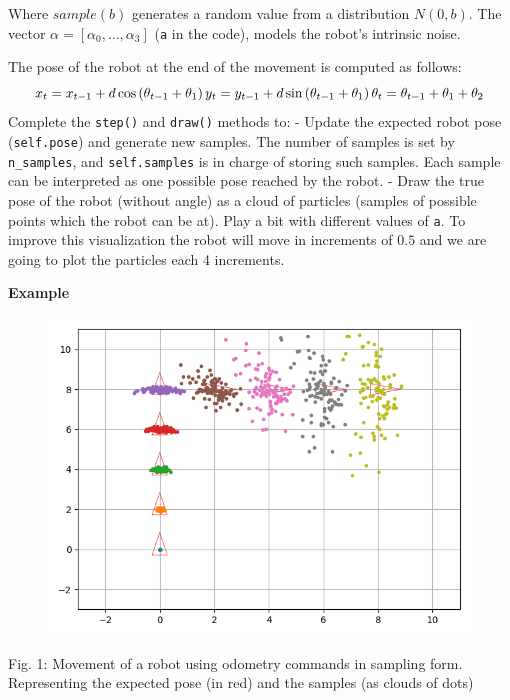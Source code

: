 \documentclass[11pt]{article}
\begin{document}
Where \(sample(b)\) generates a random value from a distribution
\(N(0, b)\). The vector \(\alpha = [\alpha_0, \dots, \alpha_3]\)
(\texttt{a} in the code), models the robot's intrinsic noise.

The pose of the robot at the end of the movement is computed as follows:
\[
    \begin{equation}
        x_t = x_{t-1} + d \cos\left(\theta_{t-1} + \theta_1 \right) \\
        y_t = y_{t-1} + d \sin\left(\theta_{t-1} + \theta_1 \right) \\
        \theta_t = \theta_{t-1} +  \theta_1 +  \theta_2
    \end{equation}
\] Complete the \texttt{step()} and \texttt{draw()} methods to: - Update
the expected robot pose (\texttt{self.pose}) and generate new samples.
The number of samples is set by \texttt{n\_samples}, and
\texttt{self.samples} is in charge of storing such samples. Each sample
can be interpreted as one possible pose reached by the robot. - Draw the
true pose of the robot (without angle) as a cloud of particles (samples
of possible points which the robot can be at). Play a bit with different
values of \texttt{a}. To improve this visualization the robot will move
in increments of \(0.5\) and we are going to plot the particles each 4
increments.

\textbf{Example}

\begin{figure}
\centering
\includegraphics{images/fig3-3-2.PNG}
\end{figure}
Fig. 1: Movement of a robot using odometry commands in sampling form.
Representing the expected pose (in red) and the samples (as clouds of
dots)
\end{document}
